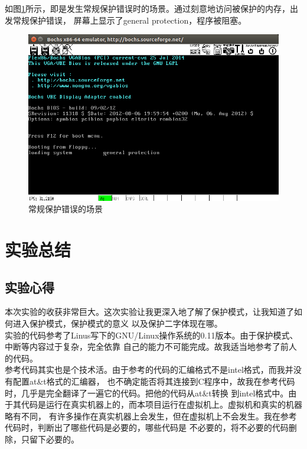 \documentclass[a4paper]{article}
\begin{document}
如图\ref{fig:general}所示，即是发生常规保护错误时的场景。通过刻意地访问被保护的内存，出发常规保护错误，
屏幕上显示了general protection，程序被阻塞。\\ 

\begin{figure}[!hbt]
    \begin{center}
    \includegraphics[scale=0.4]{assets/generalprotectionerror.png}
    \caption{常规保护错误的场景\label{fig:general}} 
    \end{center} 
\end{figure} 



\section{实验总结}
    \subsection{实验心得}
    本次实验的收获非常巨大。这次实验让我更深入地了解了保护模式，让我知道了如何进入保护模式，保护模式的意义
    以及保护二字体现在哪。\\ 

    实验的代码参考了Linus写下的GNU/Linux操作系统的0.11版本。由于保护模式、中断等内容过于复杂，完全依靠
    自己的能力不可能完成。故我适当地参考了前人的代码。\\ 

    参考代码其实也是个技术活。由于参考的代码的汇编格式不是intel格式，而我并没有配置at\&t格式的汇编器，
    也不确定能否将其连接到C程序中，故我在参考代码时，几乎是完全翻译了一遍它的代码。把他的代码从at\&t转换
    到intel格式中。由于其代码是运行在真实机器上的，而本项目运行在虚拟机上。虚拟机和真实的机器略有不同，
    有许多操作在真实机器上会发生，但在虚拟机上不会发生。我在参考代码时，判断出了哪些代码是必要的，哪些代码是
    不必要的，将不必要的代码删除，只留下必要的。\\ 
\end{document}
